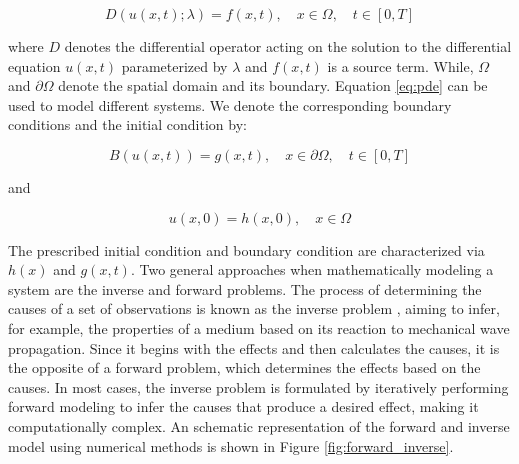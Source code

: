 \documentclass[11pt,twoside]{article}
\begin{document}
\begin{equation*}
D(u(x,t); \lambda) = f(x,t), \quad x \in \Omega, \quad t \in [0, T]\label{eq:pde}
\end{equation*}
 
where $D$ denotes the differential operator acting on the solution to the differential equation $u(x,t)$ parameterized 
by $\lambda$ and $f(x, t)$ is a source term. While, $\Omega$ and $\partial\Omega$ denote the spatial domain and its boundary. 
Equation \ref{eq:pde} can be used to model different systems. We denote the corresponding boundary conditions and the initial 
condition by:

\begin{equation*}
B (u(x, t)) = g(x, t), \quad x \in \partial \Omega, \quad t \in [0, T] 
\end{equation*}

and

\begin{equation*}
u(x, 0) = h(x, 0), \quad x \in \Omega
\end{equation*}

The prescribed initial condition and boundary condition are characterized via $h(x)$ and $g(x, t)$. Two general approaches when 
mathematically modeling a system are the inverse and forward problems. The process of determining the causes 
of a set of observations is known as the inverse problem \citep{Tarantola}, aiming to infer, for example, the properties of a medium 
based on its reaction to mechanical wave propagation. Since it begins with the effects and then calculates the causes, it is the 
opposite of a forward problem, which determines the effects based on the causes. In most cases, the inverse problem is formulated 
by iteratively performing forward modeling to infer the causes that produce a desired effect, making it computationally complex. 
An schematic representation of the forward and inverse model using numerical methods is shown in Figure \ref{fig:forward_inverse}.
\end{document}
